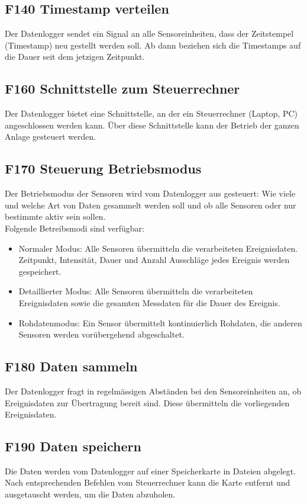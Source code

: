 \subsection{F140 Timestamp verteilen}
Der Datenlogger sendet ein Signal an alle Sensoreinheiten, dass der Zeitstempel (Timestamp) neu gestellt werden soll. Ab dann beziehen sich die Timestamps auf die Dauer seit dem jetzigen Zeitpunkt.


\subsection{F160 Schnittstelle zum Steuerrechner}
Der Datenlogger bietet eine Schnittstelle, an der ein Steuerrechner (Laptop, PC) angeschlossen werden kann. Über diese Schnittstelle kann der Betrieb der ganzen Anlage gesteuert werden.


\subsection{F170 Steuerung Betriebsmodus}
Der Betriebsmodus der Sensoren wird vom Datenlogger aus gesteuert: Wie viele und welche Art von Daten gesammelt werden soll und ob alle Sensoren oder nur bestimmte aktiv sein sollen. \\
Folgende Betreibsmodi sind verfügbar:
\begin{itemize}
\item Normaler Modus: Alle Sensoren übermitteln die verarbeiteten Ereignisdaten. Zeitpunkt, Intensität, Dauer und Anzahl Ausschläge jedes Ereignis werden gespeichert.
\item Detaillierter Modus: Alle Sensoren übermitteln die verarbeiteten Ereignisdaten sowie die gesamten Messdaten für die Dauer des Ereignis.
\item Rohdatenmodus: Ein Sensor übermittelt kontinuierlich Rohdaten, die anderen Sensoren werden vorübergehend abgeschaltet.
\end{itemize}


\subsection{F180 Daten sammeln}
Der Datenlogger fragt in regelmässigen Abständen bei den Sensoreinheiten an, ob Ereignisdaten zur Übertragung bereit sind. Diese übermitteln die vorliegenden Ereignisdaten.


\subsection{F190 Daten speichern}
Die Daten werden vom Datenlogger auf einer Speicherkarte in Dateien abgelegt. Nach entsprechenden Befehlen vom Steuerrechner kann die Karte entfernt und ausgetauscht werden, um die Daten abzuholen.


